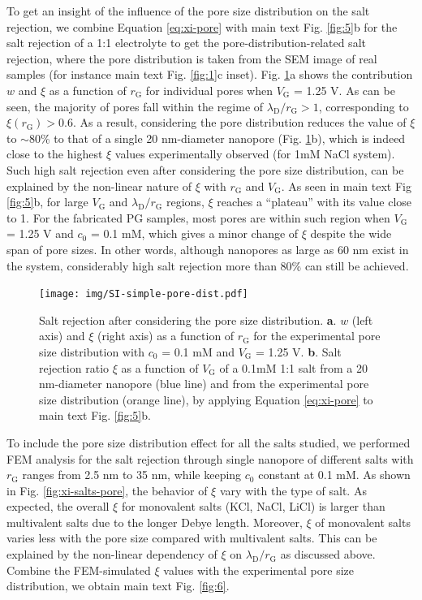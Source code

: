 \documentclass[journal=langd5,email=true, hyperref=true, keywords=false]{achemso}
\begin{document}
To get an insight of the influence of the pore size distribution on
the salt rejection, we combine Equation \ref{eq:xi-pore} with main
text Fig. \ref{fig:5}b for the salt rejection of a 1:1
electrolyte to get the pore-distribution-related salt rejection, where
the pore distribution is taken from the SEM image of real samples (for
instance main text Fig. \ref{fig:1}c inset). Fig.
\ref{fig:simple-rect-pore}a shows the contribution $w$ and $\xi$ as
a function of $r_{\mathrm{G}}$ for individual pores when
$V_{\mathrm{G}}$ = 1.25 V. As can be seen, the majority of pores fall
within the regime of $\lambda_{\mathrm{D}} / r_{\mathrm{G}} > 1$,
corresponding to $\xi(r_{\mathrm{G}}) > 0.6$. As a result, considering
the pore distribution reduces the value of $\xi$ to $\sim{}$80\% to
that of a single 20 nm-diameter nanopore (Fig.
\ref{fig:simple-rect-pore}b), which is indeed close to the highest
$\xi$ values experimentally observed (for 1mM NaCl system). Such high
salt rejection even after considering the pore size distribution, can
be explained by the non-linear nature of $\xi$ with $r_{\mathrm{G}}$
and $V_{\mathrm{G}}$. As seen in main text Fig{} \ref{fig:5}b,
for large $V_{\mathrm{G}}$ and $\lambda_{\mathrm{D}} / r_{\mathrm{G}}$
regions, $\xi$ reaches a ``plateau'' with its value close to 1. For
the fabricated PG samples, most pores are within such region when
$V_{\mathrm{G}}$ = 1.25 V and $c_{0}$ = 0.1 mM, which gives a minor
change of $\xi$ despite the wide span of pore sizes. In other words,
although nanopores as large as 60 nm exist in the system, considerably
high salt rejection more than 80\% can still be achieved.

\begin{figure}[htbp]
  \centering
   \texttt{[image: img/SI-simple-pore-dist.pdf]}
   \caption{Salt rejection after considering the pore size
     distribution. \textbf{a}. $w$ (left axis) and $\xi$ (right axis)
     as a function of $r_{\mathrm{G}}$ for the experimental pore size
     distribution with $c_{0}$ = 0.1 mM and $V_{\mathrm{G}}$ = 1.25 V.
     \textbf{b}. Salt rejection ratio $\xi$ as a function of $V_{\mathrm{G}}$ of a
     0.1mM 1:1 salt from a 20 nm-diameter nanopore (blue line) and
     from the experimental pore size distribution (orange line), by
     applying Equation \ref{eq:xi-pore} to main text Fig.
     \ref{fig:5}b.}
  \label{fig:simple-rect-pore}
\end{figure}

To include the pore size distribution effect for all the salts
studied, we performed FEM analysis for the salt rejection through
single nanopore of different salts with $r_{\mathrm{G}}$ ranges from
2.5 nm to 35 nm, while keeping $c_{0}$ constant at 0.1 mM. As shown in
Fig. \ref{fig:xi-salts-pore}, the behavior of $\xi$ vary with the
type of salt. As expected, the overall $\xi$ for monovalent salts
(KCl, NaCl, LiCl) is larger than multivalent salts due to the longer
Debye length. Moreover, $\xi$ of monovalent salts varies less with the
pore size compared with multivalent salts. This can be explained by
the non-linear dependency of $\xi$ on
$\lambda_{\mathrm{D}} / r_{\mathrm{G}}$ as discussed above. Combine
the FEM-simulated $\xi$ values with the experimental pore size
distribution, we obtain main text Fig. \ref{fig:6}.
\end{document}
